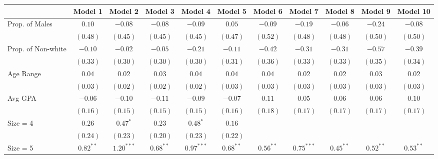 \documentclass[]{article}
\begin{document}
\begin{landscape}

\begin{table}
\begin{center}
\begin{tabular}{l c c c c c c c c c c }
\hline
 & Model 1 & Model 2 & Model 3 & Model 4 & Model 5 & Model 6 & Model 7 & Model 8 & Model 9 & Model 10 \\
\hline
Prop. of Males             & $0.10$      & $-0.08$      & $-0.08$     & $-0.09$      & $0.05$      & $-0.09$     & $-0.19$      & $-0.06$     & $-0.24$     & $-0.08$     \\
                           & $(0.48)$    & $(0.45)$     & $(0.45)$    & $(0.45)$     & $(0.47)$    & $(0.52)$    & $(0.48)$     & $(0.48)$    & $(0.50)$    & $(0.50)$    \\
Prop. of Non-white         & $-0.10$     & $-0.02$      & $-0.05$     & $-0.21$      & $-0.11$     & $-0.42$     & $-0.31$      & $-0.31$     & $-0.57$     & $-0.39$     \\
                           & $(0.33)$    & $(0.30)$     & $(0.30)$    & $(0.30)$     & $(0.31)$    & $(0.36)$    & $(0.33)$     & $(0.33)$    & $(0.35)$    & $(0.34)$    \\
Age Range                  & $0.04$      & $0.02$       & $0.03$      & $0.04$       & $0.04$      & $0.04$      & $0.02$       & $0.02$      & $0.03$      & $0.02$      \\
                           & $(0.03)$    & $(0.02)$     & $(0.02)$    & $(0.02)$     & $(0.03)$    & $(0.03)$    & $(0.03)$     & $(0.03)$    & $(0.03)$    & $(0.03)$    \\
Avg GPA                    & $-0.06$     & $-0.10$      & $-0.11$     & $-0.09$      & $-0.07$     & $0.11$      & $0.05$       & $0.06$      & $0.06$      & $0.10$      \\
                           & $(0.16)$    & $(0.15)$     & $(0.15)$    & $(0.15)$     & $(0.16)$    & $(0.18)$    & $(0.17)$     & $(0.17)$    & $(0.17)$    & $(0.17)$    \\
Size = 4                   & $0.26$      & $0.47^{*}$   & $0.23$      & $0.48^{*}$   & $0.16$      &             &              &             &             &             \\
                           & $(0.24)$    & $(0.23)$     & $(0.20)$    & $(0.23)$     & $(0.22)$    &             &              &             &             &             \\
Size = 5                   & $0.82^{**}$ & $1.20^{***}$ & $0.68^{**}$ & $0.97^{***}$ & $0.68^{**}$ & $0.56^{**}$ & $0.75^{***}$ & $0.45^{**}$ & $0.52^{**}$ & $0.53^{**}$ \\

\end{tabular}
\end{center}
\end{table}
\end{landscape}
\end{document}
